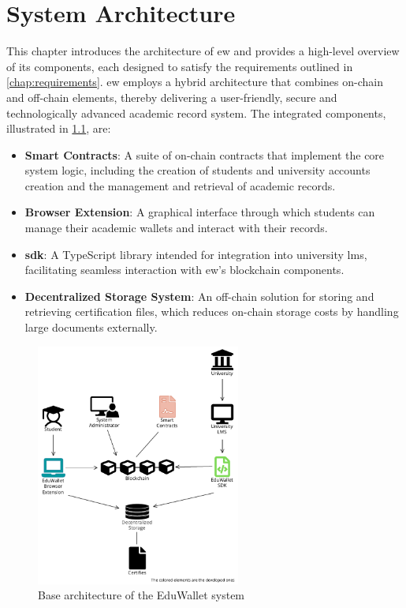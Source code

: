 \chapter{System Architecture}
\label{chap:systemArchitecture}
This chapter introduces the architecture of \gls{ew} and provides a high-level overview of its components, each designed to satisfy the requirements outlined in \cref{chap:requirements}. \gls{ew} employs a hybrid architecture that combines on-chain and off-chain elements, thereby delivering a user-friendly, secure and technologically advanced academic record system. The integrated components, illustrated in \cref{fig:baseArchDiag}, are:
\begin{itemize}
    \item \textbf{Smart Contracts}: A suite of on-chain contracts that implement the core system logic, including the creation of students and university accounts creation and the management and retrieval of academic records. 
    \item \textbf{Browser Extension}: A graphical interface through which students can manage their academic wallets and interact with their records.
    \item \textbf{\gls{sdk}}: A TypeScript library intended for integration into university \gls{lms}, facilitating seamless interaction with \gls{ew}'s blockchain components.
    \item \textbf{Decentralized Storage System}: An off-chain solution for storing and retrieving certification files, which reduces on-chain storage costs by handling large documents externally.
\end{itemize}
\begin{figure}
  \centering
  \includegraphics[width=0.6\textwidth]{figures/Architecture diagram basic.pdf}
  \caption[System basic architecture diagram]{Base architecture of the EduWallet system}
  \label{fig:baseArchDiag}
\end{figure}

